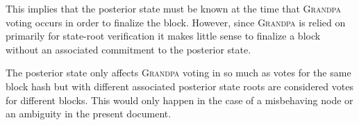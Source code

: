 This implies that the posterior state must be known at the time that \textsc{Grandpa} voting occurs in order to finalize the block. However, since \textsc{Grandpa} is relied on primarily for state-root verification it makes little sense to finalize a block without an associated commitment to the posterior state.

The posterior state only affects \textsc{Grandpa} voting in so much as votes for the same block hash but with different associated posterior state roots are considered votes for different blocks. This would only happen in the case of a misbehaving node or an ambiguity in the present document.